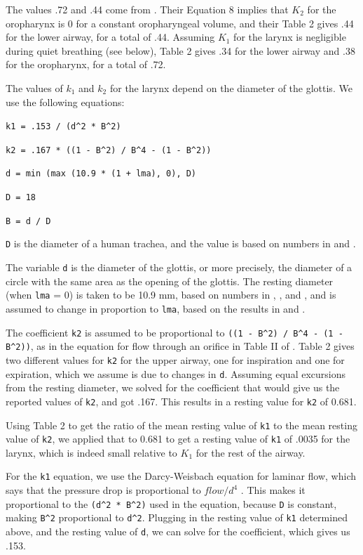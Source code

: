 \documentclass[12pt,openany,oneside]{book}
\newcommand{\ticode}[1]{\texttt{#1}}
\begin{document}
The values .72 and .44 come from
\citet{Renotte1998}.  Their Equation 8 implies
that $K_2$ for the oropharynx is 0 for a constant oropharyngeal
volume, and their Table 2 gives .44 for the lower airway, for a total
of .44.  Assuming $K_1$ for the larynx is negligible during quiet
breathing (see below), Table 2 gives .34 for the lower airway and .38
for the oropharynx, for a total of .72.

The values of $k_1$ and $k_2$ for the larynx depend on the diameter of
the glottis.  We use the following equations:

\verb~k1 = .153 / (d^2 * B^2)~

\verb~k2 = .167 * ((1 - B^2) / B^4 - (1 - B^2))~

\ticode{d = min (max (10.9 * (1 + lma), 0), D)}

\ticode{D = 18}

\ticode{B = d / D}


\verb~D~ is the diameter of a human trachea, and the value is based on
numbers in \citet{Breatnach01051984} and \citet{CA:CA20815}.

The variable \verb~d~ is the diameter of the glottis, or more precisely,
the diameter of a circle with the same area as the opening of the
glottis.  The resting diameter (when \verb~lma~ = 0) is taken to be
10.9 mm, based on numbers in \citet{D'Urzo01011988},
\citet{Brancatisano01051983}, and \citet{Baier1977}, and is assumed to
change in proportion to \verb~lma~, based on the results in
\citet{Tully01051990} and \cite{Tully01051991}.

The coefficient \verb~k2~ is assumed to be proportional to
\verb~((1 - B^2) / B^4 - (1 - B^2))~, as in the equation for flow
through an orifice in Table II of \citet{Simpson1968}.
\citet{Renotte1998} Table 2 gives two different values for \verb~k2~
for the upper airway, one for inspiration and one for expiration,
which we assume is due to changes in \verb~d~.  Assuming equal
excursions from the resting diameter, we solved for the coefficient
that would give us the reported values of \verb~k2~, and got .167.
This results in a resting value for \verb~k2~ of 0.681.

Using \citet{Tully01051990} Table 2 to get the ratio of the mean
resting value of \verb~k1~ to the mean resting value of \verb~k2~, we
applied that to 0.681 to get a resting value of \verb~k1~ of .0035 for
the larynx, which is indeed small relative to $K_1$ for the rest of
the airway.

For the \verb~k1~ equation, we use the Darcy-Weisbach equation for
laminar flow, which says that the pressure drop is proportional to
$flow/d^4$ \citep{Kreith2004}.  This makes it proportional to the
\verb~(d^2 * B^2)~ used in the equation, because \verb~D~ is constant,
making \verb~B^2~ proportional to \verb~d^2~.  Plugging in the resting
value of \verb~k1~ determined above, and the resting value of
\verb~d~, we can solve for the coefficient, which gives us .153.
\end{document}
